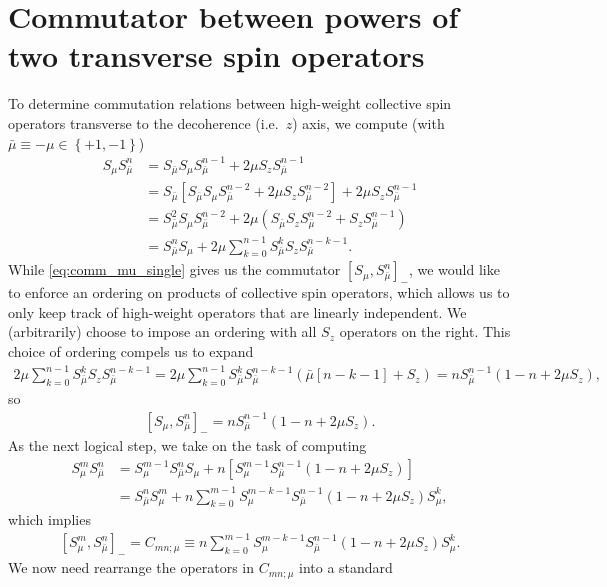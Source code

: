 \documentclass[aps,notitlepage,nofootinbib,11pt]{revtex4-1}
\newcommand{\p}[1]{\left(#1\right)} %
\renewcommand{\sp}[1]{\left[#1\right]} %
\renewcommand{\set}[1]{\left\{#1\right\}} %
\newcommand{\bmu}{{\bar\mu}}
\newcommand{\1}{\mathds{1}}
\begin{document}
\section{Commutator between powers of two transverse spin operators}
\label{sec:comm_transverse}

To determine commutation relations between high-weight collective spin
operators transverse to the decoherence (i.e.~$z$) axis, we compute
(with $\bmu\equiv-\mu\in\set{+1,-1}$)
\begin{align}
  S_\mu S_\bmu^n
  &= S_\bmu S_\mu S_\bmu^{n-1} + 2\mu S_z S_\bmu^{n-1} \\
  &= S_\bmu \sp{S_\bmu S_\mu S_\bmu^{n-2} + 2\mu S_z S_\bmu^{n-2}}
  + 2\mu S_z S_\bmu^{n-1} \\
  &= S_\bmu^2 S_\mu S_\bmu^{n-2}
  + 2\mu \p{S_\bmu S_z S_\bmu ^{n-2} + S_z S_\bmu^{n-1}} \\
  &= S_\bmu^n S_\mu + 2\mu \sum_{k=0}^{n-1} S_\bmu^k S_z S_\bmu^{n-k-1}.
  \label{eq:comm_mu_single}
\end{align}
While \eqref{eq:comm_mu_single} gives us the commutator
$\sp{S_\mu,S_\bmu^n}_-$, we would like to enforce an ordering on
products of collective spin operators, which allows us to only keep
track of high-weight operators that are linearly independent.  We
(arbitrarily) choose to impose an ordering with all $S_z$ operators on
the right.  This choice of ordering compels us to expand
\begin{align}
  2 \mu \sum_{k=0}^{n-1} S_\bmu^k S_z S_\bmu^{n-k-1}
  = 2 \mu \sum_{k=0}^{n-1}
  S_\bmu^k S_\bmu^{n-k-1} \p{\bmu\sp{n-k-1} + S_z}
  = n S_\bmu^{n-1}\p{1 - n + 2\mu S_z},
\end{align}
so
\begin{align}
  \sp{S_\mu, S_\bmu^n}_-
  = n S_\bmu^{n-1}\p{1 - n + 2\mu S_z}.
\end{align}
As the next logical step, we take on the task of computing
\begin{align}
  S_\mu^m S_\bmu^n
  &= S_\mu^{m-1} S_\bmu^n S_\mu
  + n \sp{S_\mu^{m-1} S_\bmu^{n-1} \p{1 - n + 2\mu S_z}} \\
  &= S_\bmu^n S_\mu^m
  + n \sum_{k=0}^{m-1} S_\mu^{m-k-1} S_\bmu^{n-1}
  \p{1 - n + 2\mu S_z} S_\mu^k,
\end{align}
which implies
\begin{align}
  \sp{S_\mu^m, S_\bmu^n}_-
  = C_{mn;\mu}
  \equiv n \sum_{k=0}^{m-1} S_\mu^{m-k-1} S_\bmu^{n-1}
  \p{1 - n + 2\mu S_z} S_\mu^k.
\end{align}
We now need rearrange the operators in $C_{mn;\mu}$ into a standard
\end{document}

